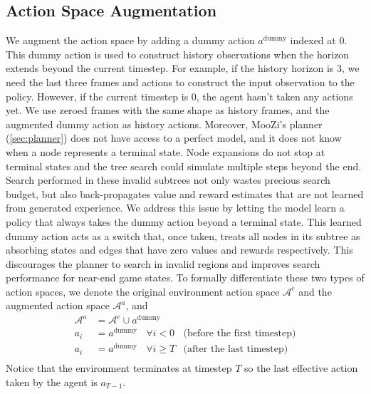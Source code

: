 \subsection{Action Space Augmentation} \label{sec:a_aug}
We augment the action space by adding a dummy action $a^\text{dummy}$ indexed at 0.
This dummy action is used to construct history observations when the horizon extends beyond the current timestep.
For example, if the history horizon is 3, we need the last three frames and actions to construct the input observation to the policy.
However, if the current timestep is 0, the agent hasn't taken any actions yet.
We use zeroed frames with the same shape as history frames, and the augmented dummy action as history actions.
Moreover, MooZi's planner (\ref{sec:planner}) does not have access to a perfect model, and it does not know when a node represents a terminal state.
Node expansions do not stop at terminal states and the tree search could simulate multiple steps beyond the end.
Search performed in these invalid subtrees not only wastes precious search budget, but also back-propagates value and reward estimates that are not learned from generated experience.
We address this issue by letting the model learn a policy that always takes the dummy action beyond a terminal state.
This learned dummy action acts as a switch that, once taken, treats all nodes in its subtree as absorbing states and edges that have zero values and rewards respectively.
This discourages the planner to search in invalid regions and improves search performance for near-end game states.
To formally differentiate these two types of action spaces, we denote the original environment action space $\mathcal{A}^e$ and the augmented action space $\mathcal{A}^a$, and
\begin{align*}
    \mathcal{A}^a  & = \mathcal{A}^e \cup a^\text{dummy}  \\
    a_{i}          & = a^\text{dummy} ~~~~ \forall i < 0     & \text{(before the first timestep)}  \\
    a_{i}          & = a^\text{dummy} ~~~~ \forall i \geq T  & \text{(after the last timestep)}  \\
\end{align*}
Notice that the environment terminates at timestep $T$ so the last effective action taken by the agent is $a_{T-1}$.


